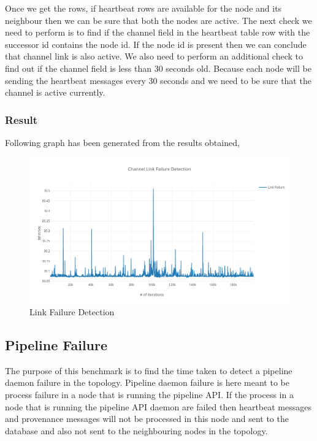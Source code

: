 Once we get the rows, if heartbeat rows are available for the node and its neighbour then we can be sure that both the nodes are active.
The next check we need to perform is to find if the channel field in the heartbeat table row with the successor id contains the node id.
If the node id is present then we can conclude that channel link is also active. We also need to perform an additional check to find out if the channel field is less than 30 seconds old. Because each node will be sending the heartbeat messages every 30 seconds and we need to be sure that the channel is active currently.

\subsubsection{Result}

Following graph has been generated from the results obtained,

\begin{figure}[H]
	\center
	\includegraphics[width=1\textwidth]{figures/benchmark_link.png}
	\caption{Link Failure Detection}
	\label{fig:benchmark_link}
\end{figure}

\subsection{Pipeline Failure}

The purpose of this benchmark is to find the time taken to detect a pipeline daemon failure in the topology. Pipeline daemon failure is here meant to be process failure in a node that is running the pipeline API. If the process in a node that is running the pipeline API daemon are failed then heartbeat messages and provenance messages will not be processed in this node and sent to the database and also not sent to the neighbouring nodes in the topology.

